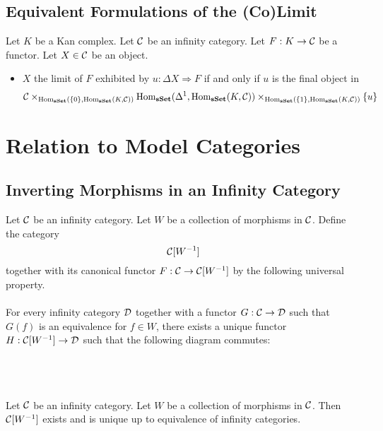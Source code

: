 \documentclass[a4paper]{article}
\begin{document}
\subsection{Equivalent Formulations of the (Co)Limit}
\begin{prp}{}{} Let $K$ be a Kan complex. Let $\mathcal{C}$ be an infinity category. Let $F:K\to\mathcal{C}$ be a functor. Let $X\in\mathcal{C}$ be an object. 
\begin{itemize}
\item $X$ the limit of $F$ exhibited by $u:\Delta X\Rightarrow F$ if and only if $u$ is the final object in $$\mathcal{C}\times_{\operatorname{Hom}_\bold{sSet}(\{0\},\operatorname{Hom}_\bold{sSet}(K,\mathcal{C}))}\operatorname{Hom}_\bold{sSet}(\Delta^1,\operatorname{Hom}_\bold{sSet}(K,\mathcal{C}))\times_{\operatorname{Hom}_\bold{sSet}(\{1\},\operatorname{Hom}_\bold{sSet}(K,\mathcal{C}))}\{u\}$$
\end{itemize}
\end{prp}


\pagebreak
\section{Relation to Model Categories}
\subsection{Inverting Morphisms in an Infinity Category}
\begin{defn}{}{} Let $\mathcal{C}$ be an infinity category. Let $W$ be a collection of morphisms in $\mathcal{C}$. Define the category $$\mathcal{C}[W^{-1}]$$ together with its canonical functor $F:\mathcal{C}\to\mathcal{C}[W^{-1}]$ by the following universal property. \\~\\

For every infinity category $\mathcal{D}$ together with a functor $G:\mathcal{C}\to\mathcal{D}$ such that $G(f)$ is an equivalence for $f\in W$, there exists a unique functor $H:\mathcal{C}[W^{-1}]\to\mathcal{D}$ such that the following diagram commutes: \\~\\
\\~\\
\end{defn}

\begin{prp}{}{} Let $\mathcal{C}$ be an infinity category. Let $W$ be a collection of morphisms in $\mathcal{C}$. Then $\mathcal{C}[W^{-1}]$ exists and is unique up to equivalence of infinity categories. 
\end{prp}
\end{document}
